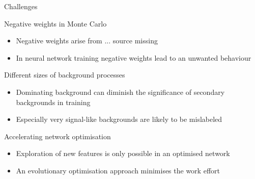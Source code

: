 \begin{frame}{Challenges}
    \begin{block}{Negative weights in Monte Carlo}
        \begin{itemize}
            \item Negative weights arise from ... source missing
            \item In neural network training negative weights lead to an unwanted behaviour
        \end{itemize}
    \end{block}
    \begin{block}{Different sizes of background processes}
        \begin{itemize}
            \item Dominating background can diminish the significance of secondary backgrounds in training
            \item Especially very signal-like backgrounds are likely to be mislabeled
        \end{itemize}
    \end{block}
    \begin{block}{Accelerating network optimisation}
        \begin{itemize}
            \item Exploration of new features is only possible in an optimised network
            \item An evolutionary optimisation approach minimises the work effort
        \end{itemize}
    \end{block}
\end{frame}